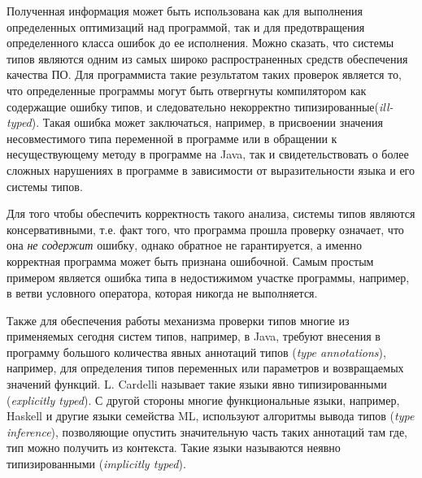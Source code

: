
Полученная информация может быть использована как для выполнения определенных
оптимизаций над программой, так и для предотвращения определенного класса ошибок
до ее исполнения. Можно сказать, что системы типов являются одним из самых
широко распространенных средств обеспечения качества ПО. Для программиста такие
результатом таких проверок является то, что определенные программы могут быть
отвергнуты компилятором как содержащие ошибку типов, и следовательно некорректно
типизированные(\emph{ill-typed}). Такая ошибка может заключаться, например,
в присвоении значения несовместимого типа переменной в программе или в
обращении к несуществующему методу в программе на Java, так и
свидетельствовать о более сложных нарушениях в программе в зависимости от
выразительности языка и его системы типов.

Для того чтобы обеспечить корректность такого анализа, системы типов являются 
консервативными, т.е. факт того, что программа прошла проверку означает, что она
\emph{не содержит} ошибку, однако обратное не гарантируется, а именно корректная
программа может быть признана ошибочной. Самым простым примером является ошибка
типа в недостижимом участке программы, например, в ветви условного оператора,
которая никогда не выполняется. 

Также для обеспечения работы механизма проверки типов многие из применяемых
сегодня систем типов, например, в Java, требуют внесения в программу
большого количества явных аннотаций типов (\emph{type annotations}), например,
для определения типов переменных или параметров и возвращаемых значений функций.
L. Cardelli называет такие языки явно типизированными (\emph{explicitly typed}).
С другой стороны многие функциональные языки, например, Haskell и другие языки
семейства ML, используют алгоритмы вывода типов (\emph{type inference}),
позволяющие опустить значительную часть таких аннотаций там где, тип можно
получить из контекста. Такие языки называются неявно типизированными
(\emph{implicitly typed}).


